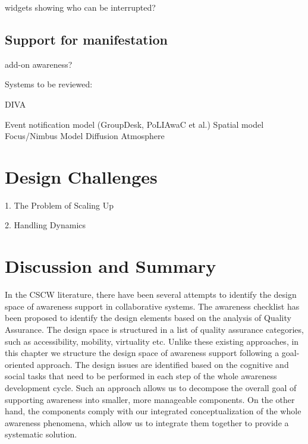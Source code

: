 widgets showing who can be interrupted?


\subsection{Support for manifestation} %
\label{sub:support_for_manifestation}
add-on awareness?

Systems to be reviewed:

DIVA \cite{springerlink:10.1023/A:1008608425504}

Event notification model (GroupDesk, PoLIAwaC et al.)
Spatial model
Focus/Nimbus Model
Diffusion
Atmosphere



\section{Design Challenges} %
\label{sec:design_challenges}
1. The Problem of Scaling Up

2. Handling Dynamics



\section{Discussion and Summary} %
\label{sec:discussion_and_summary}
In the CSCW literature, there have been several attempts to identify the design space of awareness support in collaborative systems. The awareness checklist \cite{antunes2010a} has been proposed to identify the design elements based on the analysis of Quality Assurance. The design space is structured in a list of quality assurance categories, such as accessibility, mobility, virtuality etc. Unlike these existing approaches, in this chapter we structure the design space of awareness support following a goal-oriented approach. The design issues are identified based on the cognitive and social tasks that need to be performed in each step of the whole awareness development cycle. Such an approach allows us to decompose the overall goal of supporting awareness into smaller, more manageable components. On the other hand, the components comply with our integrated conceptualization of the whole awareness phenomena, which allow us to integrate them together to provide a systematic solution.

